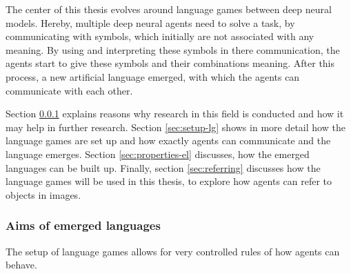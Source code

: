 The center of this thesis evolves around language games between deep neural models.
Hereby, multiple deep neural agents need to solve a task, by communicating with symbols, which initially are not associated with any meaning.
By using and interpreting these symbols in there communication, the agents start to give these symbols and their combinations meaning.
After this process, a new artificial language emerged, with which the agents can communicate with each other.

Section \ref{sec:aims_languages} explains reasons why research in this field is conducted and how it may help in further research.
Section \ref{sec:setup-lg} shows in more detail how the language games are set up and how exactly agents can communicate and the language emerges.
Section \ref{sec:properties-el} discusses, how the emerged languages can be built up.
Finally, section \ref{sec:referring} discusses how the language games will be used in this thesis, to explore how agents can refer to objects in images.

\subsubsection{Aims of emerged languages}
\label{sec:aims_languages}
The setup of language games allows for very controlled rules of how agents can behave.


